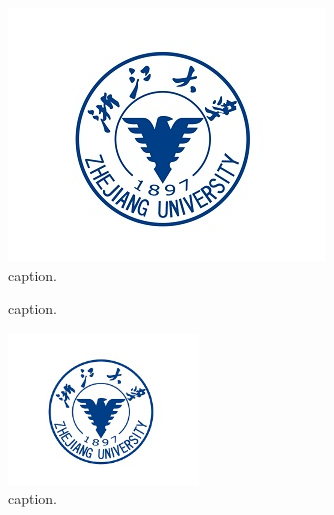 \begin{figure}[H]
    \centering
    \includegraphics[width=0.75\textwidth]{figure.png}
    \caption{caption.}
    \label{fig_1}
\end{figure}

\begin{figure}[!htbp]
    \centering
    \hfil
    \caption{caption.}
    \label{fig_sim_0}
\end{figure}

\begin{figure}[!htbp]
    \centering
    \includegraphics[width=0.45\textwidth]{figure.png}
    \caption{caption.}
    \label{fig_sim_1}
\end{figure}

